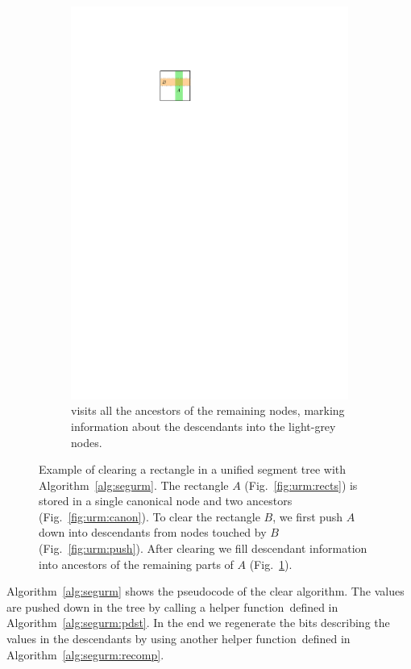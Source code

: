 \documentclass[english,gradu]{tktltiki2018}
\begin{document}
\begin{figure}
\begin{subfigure}[t]{0.4\textwidth}
		\includegraphics[width=\textwidth,page=5]{fig/uremove}
		\caption{\recomp visits all the ancestors of the remaining nodes, marking information about the descendants into the light-grey nodes.}\label{fig:urm:recomp}
	\end{subfigure}
	\caption{
	Example of clearing a rectangle in a unified segment tree with Algorithm~\ref{alg:segurm}.
	The rectangle $A$ (Fig.~\ref{fig:urm:rects}) is stored in a single canonical node and two ancestors (Fig.~\ref{fig:urm:canon}).
	To clear the rectangle $B$, we first push $A$ down into descendants from nodes touched by $B$ (Fig.~\ref{fig:urm:push}).
	After clearing we fill descendant information into ancestors of the remaining parts of $A$ (Fig.~\ref{fig:urm:recomp}).
	}\label{fig:uremove}
\end{figure}

Algorithm~\ref{alg:segurm} shows the pseudocode of the clear algorithm.
The values are pushed down in the tree by calling a helper function~\pdst defined in Algorithm~\ref{alg:segurm:pdst}.
In the end we regenerate the bits describing the values in the descendants by using another helper function~\recomp defined in Algorithm~\ref{alg:segurm:recomp}.
\end{document}
